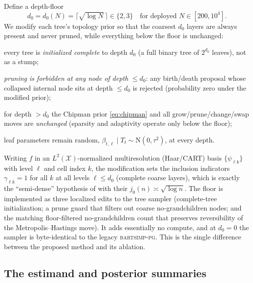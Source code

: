 \documentclass[11pt]{article}
\theoremstyle{remark}
\newcommand{\N}{\mathrm{N}}
\newcommand{\dz}{d_0}
\newcommand{\bartsimp}{\textsc{bartsimp-pg}}
\begin{document}
Define a depth-floor
\begin{equation}\label{eq:d0}
\dz = \dz(N) = \big\lceil \sqrt{\log N}\,\big\rceil \in \{2,3\}
\quad\text{for deployed } N\in[200,10^4].
\end{equation}
We modify each tree's topology prior so that the coarsest $\dz$ layers are always
present and never pruned, while everything below the floor is unchanged:
\begin{description}[leftmargin=2.2em,itemsep=2pt]
  \item[(SD1)] every tree is \emph{initialized complete} to depth $\dz$ (a full
  binary tree of $2^{\dz}$ leaves), not as a stump;
  \item[(SD2)] \emph{pruning is forbidden at any node of depth} $\le \dz$: any
  birth/death proposal whose collapsed internal node sits at depth $\le \dz$ is
  rejected (probability zero under the modified prior);
  \item[(SD3)] for depth $>\dz$ the Chipman prior \eqref{eq:chipman} and all
  grow/prune/change/swap moves are \emph{unchanged} (sparsity and adaptivity
  operate only below the floor);
  \item[(SD4)] leaf parameters remain random, $\beta_{t,\ell}\mid T_t \sim
  \N(0,\tau^2)$, at every depth.
\end{description}
Writing $f$ in an $L^2(\mathcal X)$-normalized multiresolution (Haar/CART) basis
$\{\psi_{\ell k}\}$ with level $\ell$ and cell index $k$, the modification sets the
inclusion indicators $\gamma_{\ell k}=1$ for all $k$ at all levels $\ell\le\dz$
(complete coarse layers), which is exactly the ``semi-dense'' hypothesis of
\citet{castillo2021cart} with their $j_0(n)\asymp\sqrt{\log n}$. The floor is
implemented as three localized edits to the tree sampler (complete-tree
initialization; a prune guard that filters out coarse no-grandchildren nodes;
and the matching floor-filtered no-grandchildren count that preserves
reversibility of the Metropolis--Hastings move). It adds essentially no compute,
and at $\dz=0$ the sampler is byte-identical to the legacy \bartsimp{}. This is
the single difference between the proposed method and its ablation.

\subsection{The estimand and posterior summaries}\label{sec:estimand}
\end{document}
